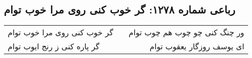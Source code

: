 \begin{center}
\section*{رباعی شماره ۱۲۷۸: گر خوب کنی روی مرا خوب توام}
\label{sec:1278}
\begin{longtable}{l p{0.5cm} r}
گر خوب کنی روی مرا خوب توام
&&
ور چنگ کنی چو چوب هم چوب توام
\\
گر پاره کنی ز رنج ایوب توام
&&
ای یوسف روزگار یعقوب توام
\\
\end{longtable}
\end{center}
